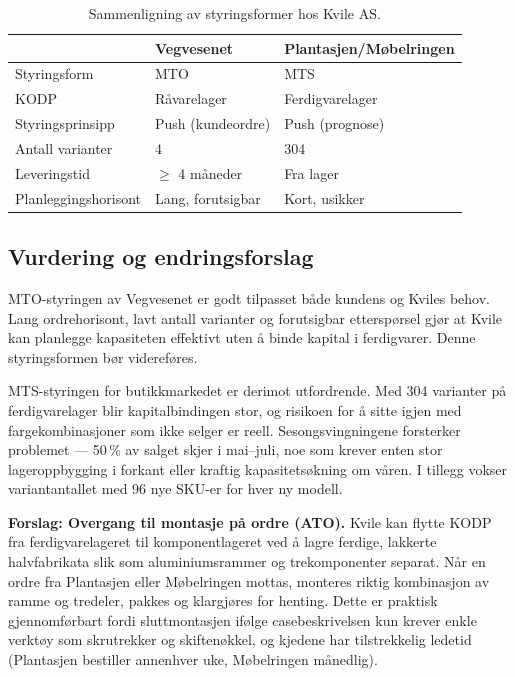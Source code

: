 \begin{table}[htbp]
    \centering
    \caption[Styringsformer]{Sammenligning av styringsformer hos Kvile AS.}
    \label{tab:styringsformer}
    \small
    \begin{tabular}{@{}lll@{}}
        \toprule
        & \textbf{Vegvesenet} & \textbf{Plantasjen/Møbelringen} \\
        \midrule
        Styringsform        & MTO                & MTS \\
        KODP                & Råvarelager         & Ferdigvarelager \\
        Styringsprinsipp    & Push (kundeordre)   & Push (prognose) \\
        Antall varianter    & 4                   & 304 \\
        Leveringstid        & $\geq$ 4 måneder   & Fra lager \\
        Planleggingshorisont & Lang, forutsigbar  & Kort, usikker \\
        \bottomrule
    \end{tabular}
\end{table}


\subsection{Vurdering og endringsforslag}

MTO-styringen av Vegvesenet er godt tilpasset både kundens og Kviles behov. Lang ordrehorisont, lavt antall varianter og forutsigbar etterspørsel gjør at Kvile kan planlegge kapasiteten effektivt uten å binde kapital i ferdigvarer. Denne styringsformen bør videreføres.

MTS-styringen for butikkmarkedet er derimot utfordrende. Med 304 varianter på ferdigvarelager blir kapitalbindingen stor, og risikoen for å sitte igjen med fargekombinasjoner som ikke selger er reell. Sesongsvingningene forsterker problemet — 50\,\% av salget skjer i mai--juli, noe som krever enten stor lageroppbygging i forkant eller kraftig kapasitetsøkning om våren. I tillegg vokser variantantallet med 96 nye SKU-er for hver ny modell.

\textbf{Forslag: Overgang til montasje på ordre (ATO).} Kvile kan flytte KODP fra ferdigvarelageret til komponentlageret ved å lagre ferdige, lakkerte halvfabrikata slik som aluminiumsrammer og trekomponenter separat. Når en ordre fra Plantasjen eller Møbelringen mottas, monteres riktig kombinasjon av ramme og tredeler, pakkes og klargjøres for henting. Dette er praktisk gjennomførbart fordi sluttmontasjen ifølge casebeskrivelsen kun krever enkle verktøy som skrutrekker og skiftenøkkel, og kjedene har tilstrekkelig ledetid (Plantasjen bestiller annenhver uke, Møbelringen månedlig).

